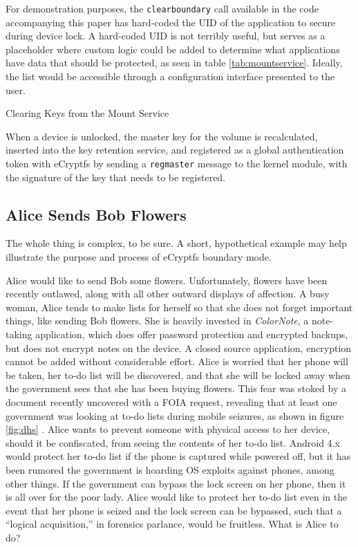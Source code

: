 For demonstration purposes, the \texttt{clearboundary} call available in the code accompanying this paper has hard-coded the UID of
the application to secure during device lock. A hard-coded UID is not terribly useful, but serves as a placeholder where custom
logic could be added to determine what applications have data that should be protected, as seen in table \ref{tab:mountservice}.
Ideally, the list would be accessible through a configuration interface presented to the user.

\begin{table}[htpb]

\caption{Clearing Keys from the Mount Service}
\label{tab:mountservice}
\end{table}

When a device is unlocked, the master key for the volume is recalculated, inserted into the key retention service, and registered
as a global authentication token with eCryptfs by sending a \texttt{regmaster} message to the kernel module, with the signature of
the key that needs to be registered. 

\subsection{Alice Sends Bob Flowers}
\label{sec:alicebob}
The whole thing is complex, to be sure. A short, hypothetical example may help illustrate the purpose and process of eCryptfs boundary mode.  

Alice would like to send Bob some flowers. Unfortunately, flowers have been recently outlawed, along with all other outward
displays of affection. A busy woman, Alice tends to make lists for herself so that she does not forget important things, like
sending Bob flowers. She is heavily invested in \emph{ColorNote}, a note-taking application, which does offer password protection
and encrypted backups, but does not encrypt notes on the device. A closed source application, encryption cannot be added without
considerable effort. Alice is worried that her phone will be taken, her to-do list will be discovered, and that she will be locked
away when the government sees that she has been buying flowers. This fear was stoked by a document recently uncovered with a FOIA
request, revealing that at least one government was looking at to-do lists during mobile seizures, as shown in figure \ref{fig:dhs}
\cite{dhsfoia}. Alice wants to prevent someone with physical access to her device, should it be confiscated, from seeing
the contents of her to-do list. Android 4.x would protect her to-do list if the phone is captured while powered off, but it has
been rumored the government is hoarding OS exploits against phones, among other things. If the government can bypass the lock screen
on her phone, then it is all over for the poor lady. Alice would like to protect her to-do list even in the event that her phone is
seized and the lock screen can be bypassed, such that a ``logical acquisition,'' in forensics parlance, would be fruitless. What is
Alice to do?

